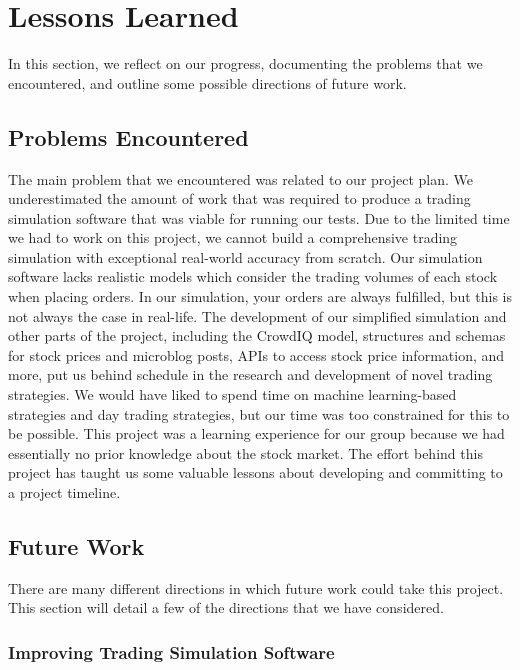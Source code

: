 \section{Lessons Learned}

In this section, we reflect on our progress, documenting the problems that we encountered, and outline some possible directions of future work.

\subsection{Problems Encountered}

The main problem that we encountered was related to our project plan.
We underestimated the amount of work that was required to produce a trading simulation software that was viable for running our tests.
Due to the limited time we had to work on this project, we cannot build a comprehensive trading simulation with exceptional real-world accuracy from scratch.
Our simulation software lacks realistic models which consider the trading volumes of each stock when placing orders.
In our simulation, your orders are always fulfilled, but this is not always the case in real-life.
The development of our simplified simulation and other parts of the project, including the CrowdIQ model, structures and schemas for stock prices and microblog posts, APIs to access stock price information, and more, put us behind schedule in the research and development of novel trading strategies.
We would have liked to spend time on machine learning-based strategies and day trading strategies, but our time was too constrained for this to be possible.
This project was a learning experience for our group because we had essentially no prior knowledge about the stock market.
The effort behind this project has taught us some valuable lessons about developing and committing to a project timeline.

\subsection{Future Work}

There are many different directions in which future work could take this project.
This section will detail a few of the directions that we have considered.

\subsubsection{Improving Trading Simulation Software}

